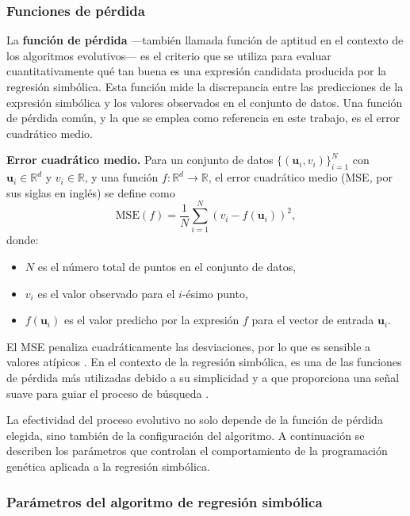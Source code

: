 \documentclass{article}
\newcommand{\R}{\mathbb{R}}
\begin{document}
\subsubsection{Funciones de pérdida}

La \textbf{función de pérdida} ---también llamada función de aptitud en el contexto de los algoritmos evolutivos--- es el criterio que se utiliza para evaluar cuantitativamente qué tan buena es una expresión candidata producida por la regresión simbólica. Esta función mide la discrepancia entre las predicciones de la expresión simbólica y los valores observados en el conjunto de datos. Una función de pérdida común, y la que se emplea como referencia en este trabajo, es el error cuadrático medio.

\textbf{Error cuadrático medio.} Para un conjunto de datos \(\{(\mathbf{u}_i, v_i)\}_{i=1}^{N}\) con \(\mathbf{u}_i \in \R^d\) y \(v_i \in \R\), y una función \(f: \R^d \to \R\), el error cuadrático medio (MSE, por sus siglas en inglés) se define como \begin{equation} \text{MSE}(f) = \frac{1}{N} \sum_{i=1}^{N} \left( v_i - f(\mathbf{u}_i) \right)^2, \end{equation} donde: \begin{itemize} \item \(N\) es el número total de puntos en el conjunto de datos, \item \(v_i\) es el valor observado para el \(i\)-ésimo punto, \item \(f(\mathbf{u}_i)\) es el valor predicho por la expresión \(f\) para el vector de entrada \(\mathbf{u}_i\). \end{itemize} El MSE penaliza cuadráticamente las desviaciones, por lo que es sensible a valores atípicos \cite{hastie2009elements}. En el contexto de la regresión simbólica, es una de las funciones de pérdida más utilizadas debido a su simplicidad y a que proporciona una señal suave para guiar el proceso de búsqueda \cite{bishop2006pattern}.

La efectividad del proceso evolutivo no solo depende de la función de pérdida elegida, sino también de la configuración del algoritmo. A continuación se describen los parámetros que controlan el comportamiento de la programación genética aplicada a la regresión simbólica.

\subsubsection{Parámetros del algoritmo de regresión simbólica}
\end{document}
